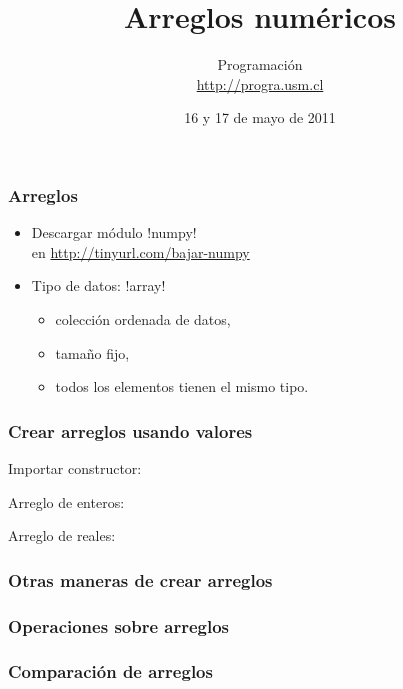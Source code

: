 \documentclass[12pt]{beamer}
\title{Arreglos numéricos}
\author{
  Programación \\ \url{http://progra.usm.cl}
}
\date{16 y 17 de mayo de 2011}
\begin{document}
  \begin{frame}
    \maketitle
  \end{frame}

  \begin{frame}
    \label{intro-arreglos}
    \frametitle{Arreglos}
    \begin{itemize}
      \item Descargar módulo \li!numpy! \\
        en \url{http://tinyurl.com/bajar-numpy}
        \vfill
      \item Tipo de datos: \li!array!
        \begin{itemize}
          \item colección ordenada de datos,
          \item tamaño fijo,
          \item todos los elementos
            tienen el mismo tipo.
        \end{itemize}
    \end{itemize}
  \end{frame}

  \begin{frame}
    \label{crear-arreglo-valores}
    \frametitle{Crear arreglos usando valores}
    Importar constructor:
    
    \vfill
    Arreglo de enteros:
    
    \vfill
    Arreglo de reales:
    
  \end{frame}

  \begin{frame}
    \label{crear-arreglo-funciones}
    \frametitle{Otras maneras de crear arreglos}
    
  \end{frame}

  \begin{frame}
    \label{operaciones-arreglos}
    \frametitle{Operaciones sobre arreglos}
    
  \end{frame}

  \begin{frame}
    \label{comparacion-arreglos}
    \frametitle{Comparación de arreglos}
    
  \end{frame}
\end{document}
